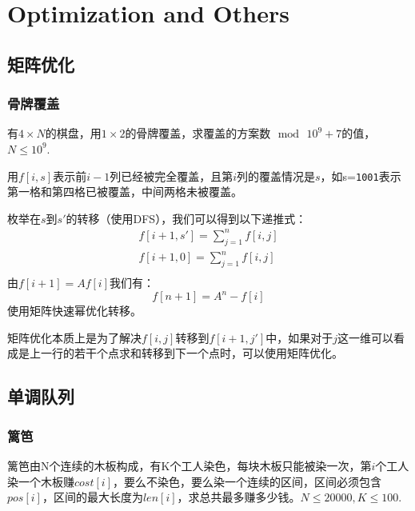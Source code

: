 \section{Optimization and Others}
\subsection{矩阵优化}
\subsubsection{骨牌覆盖}
有$4\times N$的棋盘，用$1\times 2$的骨牌覆盖，求覆盖的方案数\,$\bmod\,10^9+7$的值，$N\le 10^9$.

用$f[i,s]$表示前$i-1$列已经被完全覆盖，且第$i$列的覆盖情况是$s$，如s=\verb+1001+表示第一格和第四格已被覆盖，中间两格未被覆盖。

枚举在$s$到$s'$的转移（使用DFS），我们可以得到以下递推式：
\begin{equation*}
    \begin{aligned}
        f[i+1,s']=\sum_{j=1}^nf[i,j]\\
        f[i+1,0]=\sum_{j=1}^nf[i,j]\\
    \end{aligned}
\end{equation*}
由$f[i+1]=Af[i]$我们有：
\begin{equation*}
    f[n+1]=A^n-f[i]
\end{equation*}
使用矩阵快速幂优化转移。

矩阵优化本质上是为了解决$f[i,j]$转移到$f[i+1,j']$中，如果对于$j$这一维可以看成是上一行的若干个点求和转移到下一个点时，可以使用矩阵优化。
\subsection{单调队列}
\subsubsection{篱笆}
篱笆由N个连续的木板构成，有K个工人染色，每块木板只能被染一次，第$i$个工人染一个木板赚$cost[i]$，要么不染色，要么染一个连续的区间，区间必须包含$pos[i]$，区间的最大长度为$len[i]$，求总共最多赚多少钱。$N\le 20000, K\le 100.$


